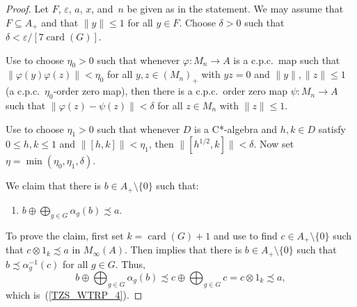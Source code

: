 \documentclass[11pt]{amsart}
\theoremstyle{plain}
\theoremstyle{definition}
\theoremstyle{remark}
\numberwithin{equation}{section}
\newcounter{TmpEnumi}
\newcommand{\et}{\eta}
\newcommand{\card}{{\operatorname{card}}}
\begin{document}
\begin{proof}
Let $F$, $\varepsilon$, $a$, $x$, and~$n$ be given as in the statement.
We may assume that $F \subseteq A_{+}$
and that $\| y \| \leq 1$ for all $y \in F$.
Choose $\delta > 0$ such that $\delta < \varepsilon / [7  \card (G)]$.

Use \cite[Proposition 2.5]{KW04}
to choose $\eta_0 > 0$ such that
whenever $\varphi \colon M_{n} \to A$
is a c.p.c.\  map
such that $\|\varphi (y) \varphi (z) \| < \eta_0$ for
all $y, z \in (M_{n})_{+}$ with $y z = 0$ and $\|y\|, \|z\| \leq 1$
(a c.p.c.\  $\et_0$-order zero map),
then there is a c.p.c.~order zero map
$\psi \colon M_{n} \to A$
such that $\|\varphi (z) - \psi (z) \| < \delta$
for all $z \in M_{n}$ with $\| z \| \leq 1$.

Use \cite[Lemma~2.5]{AP16} to choose
$\eta_1 > 0$ such that whenever $D$ is a C*-algebra
and $h, k \in D$ satisfy $0 \leq h, k \leq 1$
and $\| [h, k]\| < \eta_1$, then $\| [h^{1/2}, k] \| < \delta$.
Now set $\eta = \min (\eta_0, \eta_1, \delta)$.

We claim that there is $b \in A_{+} \setminus \{ 0 \}$ such that:
%
\begin{enumerate}
\setcounter{enumi}{\value{TmpEnumi}}
\item\label{TZS_WTRP_4}
$b \oplus \bigoplus_{g \in G} \alpha_{g} (b) \precsim a$.
\setcounter{TmpEnumi}{\value{enumi}}
\end{enumerate}
%
To prove the claim,
first set $k = \card (G) + 1$
and use \cite[Lemma~2.4]{Ph14} to find
$c \in A_{+} \setminus \{ 0 \}$ such that
$c \otimes 1_{k} \precsim a$ in $M_{\infty} (A)$.
Then \cite[Lemma~2.6]{Ph14} implies that there is
$b \in A_{+} \setminus \{ 0 \}$
such that $b \precsim \alpha_{g}^{-1} (c)$ for all $g \in G$.
Thus,
\[
b \oplus \bigoplus_{g \in G} \alpha_{g} (b)
 \precsim c \oplus \bigoplus_{g \in G} c
 = c \otimes 1_{k}
 \precsim a,
\]
which is~(\ref{TZS_WTRP_4}).


\end{proof}
\end{document}
